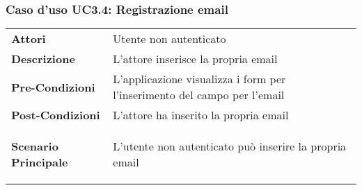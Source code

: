 \subsubsection{Caso d'uso UC3.4:  Registrazione email}
\label{UC3_4}

\begin{longtable}{ l | p{11cm}}
	\hline
	\rowcolor{Gray}
	 \multicolumn{2}{c}{UC3.4 - Inserimento email} \\
	 \hline
	\textbf{Attori} & Utente non autenticato \\
	\textbf{Descrizione} & L'attore inserisce la propria email  \\
	\textbf{Pre-Condizioni} & L'applicazione visualizza i form per l'inserimento del campo per l'email \\
	\textbf{Post-Condizioni} & L'attore ha inserito la propria email \\
	\textbf{Scenario Principale} & \begin{enumerate*}[label=(\arabic*.),itemjoin={\newline}]
		\item L'utente non autenticato può inserire la propria email
	\end{enumerate*}\\
\end{longtable}
